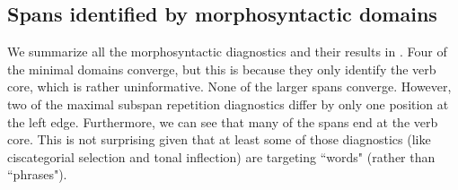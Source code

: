 \documentclass[output=paper]{langscibook}
\begin{document}
\subsection{Spans identified by morphosyntactic domains}
\label{sub:morphsyntspans}

We summarize all the morphosyntactic diagnostics and their results in .
Four of the minimal domains converge, but this is because they only identify the verb core, which is rather uninformative.
None of the larger spans converge.
However, two of the maximal subspan repetition diagnostics differ by only one position at the left edge.
Furthermore, we can see that many of the spans end at the verb core. This is not surprising given that at least some of those diagnostics (like ciscategorial selection and tonal inflection) are targeting ``words" (rather than ``phrases").


\begin{table}
\caption{Morphosyntactic diagnostics and their results}
\label{tab:morphtests}
\end{table}
\end{document}
